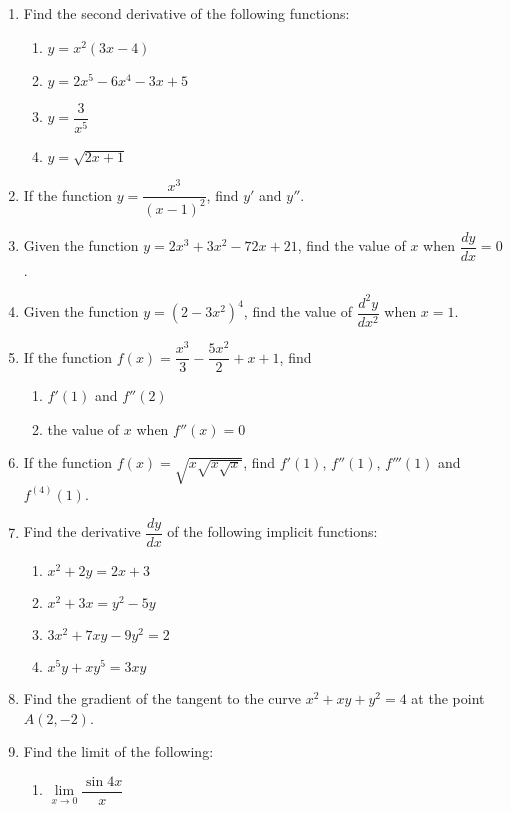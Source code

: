 \documentclass[12pt]{report}
\begin{document}
\begin{enumerate}
    \item Find the second derivative of the following functions:
          \begin{enumerate}
              \item $y=x^{2}(3x-4)$
              \item $y=2x^{5}-6x^{4}-3x+5$
              \item $y={\dfrac{3}{x^{5}}}$
              \item $y={\sqrt{2x+1}}$
          \end{enumerate}

    \item If the function $y = \dfrac{x^3}{{(x-1)}^2}$, find $y'$ and $y''$.
    \item Given the function $y = 2x^3 + 3x^2 - 72x + 21$, find the value of $x$ when
          $\dfrac{dy}{dx} = 0$.
    \item Given the function $y = {(2-3x^2)}^4$, find the value of $\dfrac{d^2y}{dx^2}$
          when $x = 1$.
    \item If the function $f (x) = \dfrac{x^3}{3} - \dfrac{5x^2}{2} + x + 1$, find
          \begin{enumerate}
              \item $f' (1)$ and $f'' (2)$
              \item the value of $x$ when $f'' (x) = 0$
          \end{enumerate}
    \item If the function $f (x) = \sqrt{x\sqrt{x\sqrt{x}}}$, find $f' (1)$, $f'' (1)$,
          $f''' (1)$ and $f^{(4)}(1)$.
    \item Find the derivative $\dfrac{dy}{dx}$ of the following implicit functions:
          \begin{enumerate}
              \item $x^{2}+2y=2x+3$
              \item $x^{2}+3x=y^{2}-5y$
              \item $3x^{2}+7x y-9y^{2}=2$
              \item $x^{5}y+x y^{5}=3x y$
          \end{enumerate}
    \item Find the gradient of the tangent to the curve $x^2 + xy + y^2 = 4$ at the point
          $A(2, -2)$.
    \item Find the limit of the following:
          \begin{enumerate}
              \item $\lim\limits_{x\to0}{\dfrac{\sin{4x}}{x}}$

\end{enumerate}
\end{enumerate}
\end{document}
